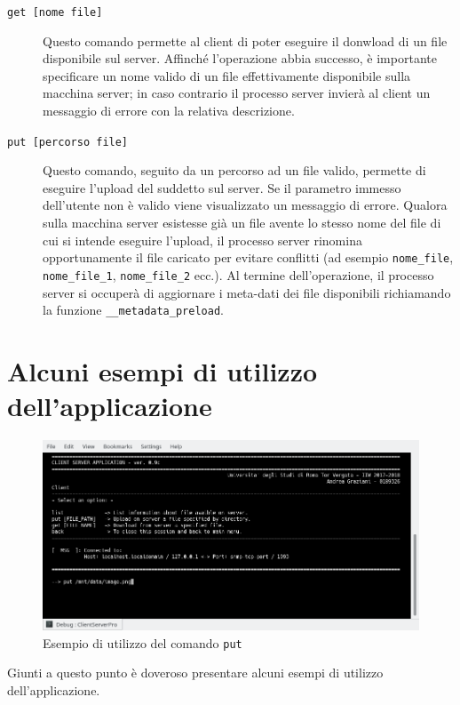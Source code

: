 \documentclass[10pt,a4paper, titlepage]{report}
\begin{document}
\begin{description}
\item[\texttt{get [nome file]}] Questo comando permette al client di poter eseguire il donwload di un file disponibile sul server. Affinché l'operazione abbia successo, è importante specificare un nome valido di un file effettivamente disponibile sulla macchina server; in caso contrario il processo server invierà al client un messaggio di errore con la relativa descrizione.
\item[\texttt{put [percorso file]}] Questo comando, seguito da un percorso ad un file valido, permette di eseguire l'upload del suddetto sul server. Se il parametro immesso dell'utente non è valido viene visualizzato un messaggio di errore. Qualora sulla macchina server esistesse già un file avente lo stesso nome del file di cui si intende eseguire l'upload, il processo server rinomina opportunamente il file caricato per evitare conflitti (ad esempio \texttt{nome\_file}, \texttt{nome\_file\_1}, \texttt{nome\_file\_2} ecc.). Al termine dell'operazione, il processo server si occuperà di aggiornare i meta-dati dei file disponibili richiamando la funzione \texttt{\_\_metadata\_preload}.



\end{description}

\newpage
\section{Alcuni esempi di utilizzo dell'applicazione}

\begin{figure}
\centering
\includegraphics[width=\textwidth]{Example1}
\caption{Esempio di utilizzo del comando \texttt{put}}
\label{fig:example1}
\end{figure}

Giunti a questo punto è doveroso presentare alcuni esempi di utilizzo dell'applicazione. 
\end{document}
